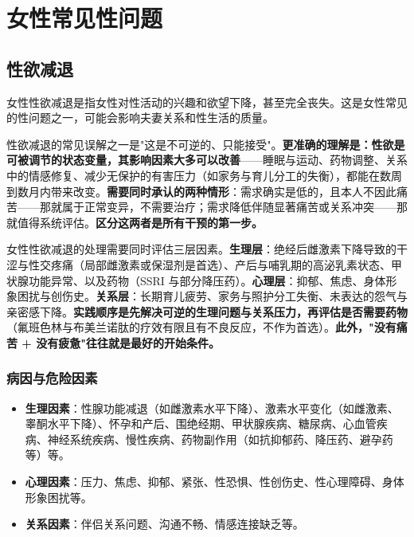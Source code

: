 \section{女性常见性问题}

\subsection{性欲减退}

女性性欲减退是指女性对性活动的兴趣和欲望下降，甚至完全丧失。这是女性常见的性问题之一，可能会影响夫妻关系和性生活的质量。

性欲减退的常见误解之一是"这是不可逆的、只能接受"。\textbf{更准确的理解是：性欲是可被调节的状态变量，其影响因素大多可以改善}——睡眠与运动、药物调整、关系中的情感修复、减少无保护的有害压力（如家务与育儿分工的失衡），都能在数周到数月内带来改变。\textbf{需要同时承认的两种情形}：需求确实是低的，且本人不因此痛苦——那就属于正常变异，不需要治疗；需求降低伴随显著痛苦或关系冲突——那就值得系统评估。\textbf{区分这两者是所有干预的第一步。}

女性性欲减退的处理需要同时评估三层因素。\textbf{生理层}：绝经后雌激素下降导致的干涩与性交疼痛（局部雌激素或保湿剂是首选）、产后与哺乳期的高泌乳素状态、甲状腺功能异常、以及药物（SSRI 与部分降压药）。\textbf{心理层}：抑郁、焦虑、身体形象困扰与创伤史。\textbf{关系层}：长期育儿疲劳、家务与照护分工失衡、未表达的怨气与亲密感下降。\textbf{实践顺序是先解决可逆的生理问题与关系压力，再评估是否需要药物}（氟班色林与布美兰诺肽的疗效有限且有不良反应，不作为首选）。\textbf{此外，"没有痛苦 + 没有疲惫"往往就是最好的开始条件。}

\subsubsection{病因与危险因素}

\begin{itemize}
\item \textbf{生理因素}：性腺功能减退（如雌激素水平下降）、激素水平变化（如雌激素、睾酮水平下降）、怀孕和产后、围绝经期、甲状腺疾病、糖尿病、心血管疾病、神经系统疾病、慢性疾病、药物副作用（如抗抑郁药、降压药、避孕药等）等。
\item \textbf{心理因素}：压力、焦虑、抑郁、紧张、性恐惧、性创伤史、性心理障碍、身体形象困扰等。
\item \textbf{关系因素}：伴侣关系问题、沟通不畅、情感连接缺乏等。
\end{itemize}

